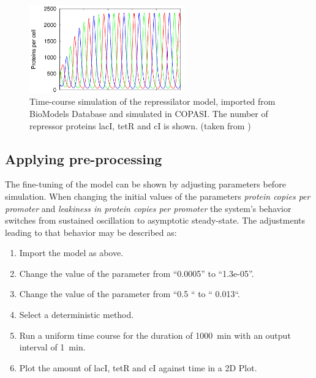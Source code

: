 \begin{figure}
\centering
\includegraphics[width=0.6\textwidth]{images/simEx1.png}
\caption{Time-course simulation of the repressilator model, imported from BioModels Database and simulated in COPASI. The number of repressor proteins lacI, tetR and cI is shown. (taken from \citep{Waltemath:2011})}
\label{fig:simEx1}
\end{figure}

\subsection{Applying pre-processing}
\label{sec:examplePreprocessing}
The fine-tuning of the model can be shown by adjusting parameters before simulation. When changing the initial values of the parameters \emph{protein copies per promoter} and \emph{leakiness in protein copies per promoter} the system's behavior switches from sustained oscillation to asymptotic steady-state. The adjustments leading to that behavior may be described as: 

\begin{enumerate}
\item{Import the model as above.}
\item{Change the value of the parameter  from “0.0005” to “1.3e-05”. }
\item{Change the value of the parameter  from “0.5 “ to “ 0.013“.}
\item{Select a deterministic method.}
\item{Run a uniform time course for the duration of 1000~min with an output interval of 1~min.}
\item Plot the amount of lacI, tetR and cI against time in a 2D Plot.
\end{enumerate}


